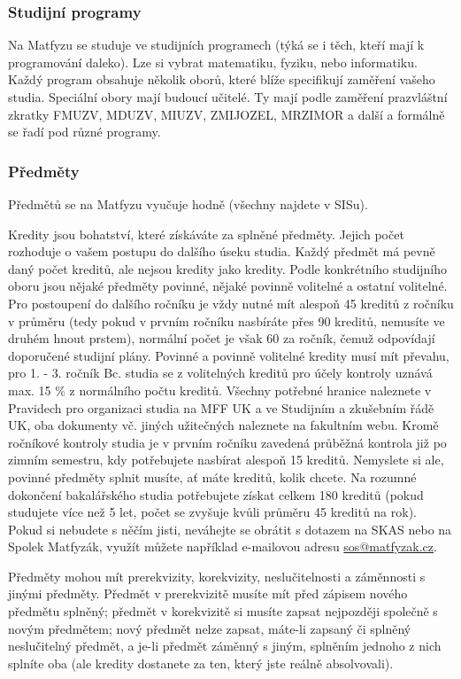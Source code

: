 \subsubsection{Studijní programy}
Na Matfyzu se studuje ve studijních programech (týká se i těch, kteří mají k
programování daleko). Lze si vybrat matematiku, fyziku, nebo informatiku. Každý
program obsahuje několik oborů, které blíže specifikují zaměření vašeho studia.
Speciální obory mají budoucí učitelé. Ty mají podle zaměření prazvláštní zkratky
FMUZV, MDUZV, MIUZV, ZMIJOZEL, MRZIMOR a další a formálně se řadí pod různé
programy.


\subsubsection{Předměty}
Předmětů se na Matfyzu vyučuje hodně (všechny najdete v SISu).

Kredity jsou bohatství, které získáváte za splněné předměty. Jejich počet
rozhoduje o vašem postupu do dalšího úseku studia. 
Každý předmět má pevně daný počet kreditů, ale nejsou kredity jako kredity.
Podle konkrétního studijního oboru jsou nějaké předměty povinné, nějaké povinně
volitelné a ostatní volitelné.
Pro postoupení do dalšího ročníku je vždy nutné mít alespoň 45 kreditů z ročníku
v průměru (tedy pokud v prvním ročníku nasbíráte přes 90 kreditů, nemusíte ve
druhém hnout prstem), normální počet je však 60 za ročník, čemuž odpovídají
doporučené studijní plány. Povinné a povinně volitelné kredity musí mít převahu,
pro 1. - 3. ročník Bc. studia se z volitelných kreditů pro účely kontroly uznává
max. 15 \% z normálního počtu kreditů. Všechny potřebné hranice naleznete v
Pravidech pro organizaci studia na MFF UK a ve Studijním a zkušebním řádě UK,
oba dokumenty vč. jiných užitečných naleznete na fakultním webu. Kromě ročníkové
kontroly studia je v prvním ročníku zavedená průběžná kontrola již po zimním
semestru, kdy potřebujete nasbírat alespoň 15 kreditů. Nemyslete si ale, povinné
předměty splnit musíte, ať máte kreditů, kolik chcete.
Na rozumné dokončení bakalářského studia potřebujete získat celkem 180 kreditů
(pokud studujete více než 5 let, počet se zvyšuje kvůli průměru 45 kreditů na
rok).
Pokud si nebudete s něčím jisti, neváhejte se obrátit s dotazem na SKAS nebo na
Spolek Matfyzák, využít můžete například e-mailovou adresu
\url{sos@matfyzak.cz}.

Předměty mohou mít prerekvizity, korekvizity, neslučitelnosti a záměnnosti s
jinými předměty.
Předmět v prerekvizitě musíte mít před zápisem nového předmětu splněný; předmět
v korekvizitě si musíte zapsat nejpozději společně s novým předmětem; nový
předmět nelze zapsat, máte-li zapsaný či splněný neslučitelný předmět, a je-li
předmět záměnný s jiným, splněním jednoho z nich splníte oba (ale kredity
dostanete za ten, který jste reálně absolvovali).

